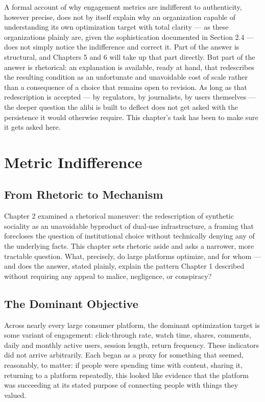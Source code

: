 \documentclass[12pt,a4paper]{book}
\begin{document}
A formal account of why engagement metrics are indifferent to authenticity, however precise, does not by itself explain why an organization capable of understanding its own optimization target with total clarity — as these organizations plainly are, given the sophistication documented in Section 2.4 — does not simply notice the indifference and correct it. Part of the answer is structural, and Chapters 5 and 6 will take up that part directly. But part of the answer is rhetorical: an explanation is available, ready at hand, that redescribes the resulting condition as an unfortunate and unavoidable cost of scale rather than a consequence of a choice that remains open to revision. As long as that redescription is accepted — by regulators, by journalists, by users themselves — the deeper question the alibi is built to deflect does not get asked with the persistence it would otherwise require. This chapter's task has been to make sure it gets asked here.


\chapter{Metric Indifference}

\section{From Rhetoric to Mechanism}

Chapter 2 examined a rhetorical maneuver: the redescription of synthetic sociality as an unavoidable byproduct of dual-use infrastructure, a framing that forecloses the question of institutional choice without technically denying any of the underlying facts. This chapter sets rhetoric aside and asks a narrower, more tractable question. What, precisely, do large platforms optimize, and for whom — and does the answer, stated plainly, explain the pattern Chapter 1 described without requiring any appeal to malice, negligence, or conspiracy?

\section{The Dominant Objective}

Across nearly every large consumer platform, the dominant optimization target is some variant of engagement: click-through rate, watch time, shares, comments, daily and monthly active users, session length, return frequency. These indicators did not arrive arbitrarily. Each began as a proxy for something that seemed, reasonably, to matter: if people were spending time with content, sharing it, returning to a platform repeatedly, this looked like evidence that the platform was succeeding at its stated purpose of connecting people with things they valued.
\end{document}
